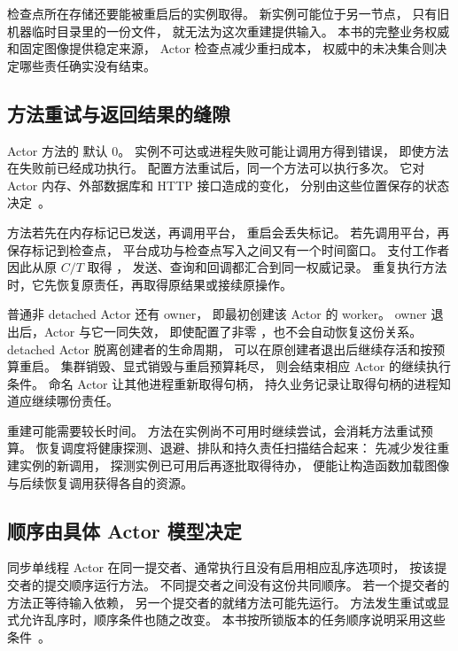 检查点所在存储还要能被重启后的实例取得。
新实例可能位于另一节点，
只有旧机器临时目录里的一份文件，
就无法为这次重建提供输入。
本书的完整业务权威和固定图像提供稳定来源，
Actor 检查点减少重扫成本，
权威中的未决集合则决定哪些责任确实没有结束。

\subsection{方法重试与返回结果的缝隙}

Actor 方法的  默认 0。
实例不可达或进程失败可能让调用方得到错误，
即使方法在失败前已经成功执行。
配置方法重试后，同一个方法可以执行多次。
它对 Actor 内存、外部数据库和 HTTP 接口造成的变化，
分别由这些位置保存的状态决定~\cite{ray259-actor-fault}。

方法若先在内存标记已发送，再调用平台，
重启会丢失标记。
若先调用平台，再保存标记到检查点，
平台成功与检查点写入之间又有一个时间窗口。
支付工作者因此从原 $C/T$ 取得 ，
发送、查询和回调都汇合到同一权威记录。
重复执行方法时，它先恢复原责任，再取得原结果或接续原操作。


普通非 detached Actor 还有 owner，
即最初创建该 Actor 的 worker。
owner 退出后，Actor 与它一同失效，
即使配置了非零 ，也不会自动恢复这份关系。
detached Actor 脱离创建者的生命周期，
可以在原创建者退出后继续存活和按预算重启。
集群销毁、显式销毁与重启预算耗尽，
则会结束相应 Actor 的继续执行条件。
命名 Actor 让其他进程重新取得句柄，
持久业务记录让取得句柄的进程知道应继续哪份责任。

重建可能需要较长时间。
方法在实例尚不可用时继续尝试，会消耗方法重试预算。
恢复调度将健康探测、退避、排队和持久责任扫描结合起来：
先减少发往重建实例的新调用，
探测实例已可用后再逐批取得待办，
便能让构造函数加载图像与后续恢复调用获得各自的资源。

\subsection{顺序由具体 Actor 模型决定}

同步单线程 Actor 在同一提交者、通常执行且没有启用相应乱序选项时，
按该提交者的提交顺序运行方法。
不同提交者之间没有这份共同顺序。
若一个提交者的方法正等待输入依赖，
另一个提交者的就绪方法可能先运行。
方法发生重试或显式允许乱序时，顺序条件也随之改变。
本书按所锁版本的任务顺序说明采用这些条件~\cite{ray259-actor-order}。

